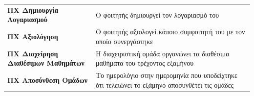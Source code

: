 \documentclass[
]{article}
\begin{document}
\begin{longtable}[]{@{}ll@{}}
\begin{minipage}[t]{0.35\columnwidth}
\textbf{ΠΧ Δημιουργία Λογαριασμού}\strut
\end{minipage} & \begin{minipage}[t]{0.59\columnwidth}\raggedright
Ο φοιτητής δημιουργεί τον λογαριασμό του\strut
\end{minipage}\tabularnewline
\begin{minipage}[t]{0.35\columnwidth}\raggedright
\textbf{ΠΧ Αξιολόγηση}\strut
\end{minipage} & \begin{minipage}[t]{0.59\columnwidth}\raggedright
Ο φοιτητής αξιολογεί κάποιο συμφοιτητή του με τον οποίο
συνεργάστηκε\strut
\end{minipage}\tabularnewline
\begin{minipage}[t]{0.35\columnwidth}\raggedright
\textbf{ΠΧ Διαχείρηση Διαθέσιμων Μαθημάτων}\strut
\end{minipage} & \begin{minipage}[t]{0.59\columnwidth}\raggedright
Η διαχειριστική ομάδα οργανώνει τα διαθέσιμα μαθήματα του τρέχοντος
εξαμήνου\strut
\end{minipage}\tabularnewline
\begin{minipage}[t]{0.35\columnwidth}\raggedright
\textbf{ΠΧ Αποσύνθεση Ομάδων}\strut
\end{minipage} & \begin{minipage}[t]{0.59\columnwidth}\raggedright
Το ημερολόγιο στην ημερομηνία που υποδείχτηκε ότι τελειώνει το εξάμηνο
αποσυνθέτει τις ομάδες\strut
\end{minipage}\tabularnewline
\bottomrule
\end{longtable}
\end{document}
